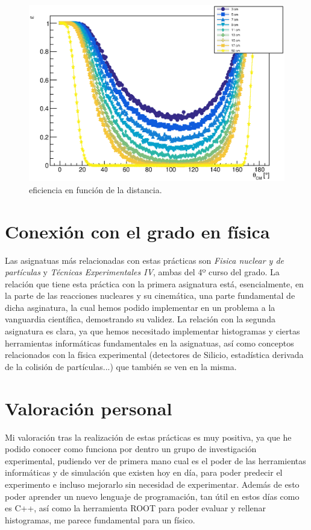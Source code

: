 \documentclass[12pt,a4paper]{article}
\numberwithin{equation}{section}
\numberwithin{figure}{section}
\begin{document}
\begin{figure}[h!] \centering
    \includegraphics[scale=0.8]{Eff.eps}
    \caption{eficiencia en función de la distancia.}
    \label{Fig:2.4-Efficiencia}
\end{figure}


\section{Conexión con el grado en física}

Las asignatuas más relacionadas con estas prácticas son {\it Fisica nuclear y de partículas} y {\it Técnicas Experimentales IV}, ambas del 4º curso del grado. La relación que tiene esta práctica con la primera asignatura está, esencialmente, en la parte de las reacciones nucleares y su cinemática, una parte fundamental de dicha asginatura, la cual hemos podido implementar en un problema a la vanguardia científica, demostrando su validez. La relación con la segunda asignatura es clara, ya que hemos necesitado implementar histogramas y ciertas herramientas informáticas fundamentales en la asignatuas, así como conceptos relacionados con la física experimental (detectores de Silicio, estadística derivada de la colisión de partículas...) que también se ven en la misma. 


\section{Valoración personal}

Mi valoración tras la realización de estas prácticas es muy positiva, ya que he podido conocer como funciona por dentro un grupo de investigación experimental, pudiendo ver de primera mano cual es el poder de las herramientas informáticas y de simulación que existen hoy en día, para poder predecir el experimento e incluso mejorarlo sin necesidad de experimentar. Además de esto poder aprender un nuevo lenguaje de programación, tan útil en estos días como es C++, así como la herramienta ROOT para poder evaluar y rellenar histogramas, me parece fundamental para un físico. \\
\end{document}
